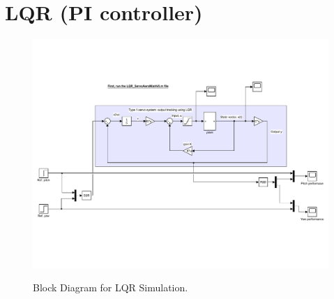 \section{LQR (PI controller)}
\begin{figure}[!htbp]
    \centering
    \includegraphics[width=.8\textwidth,keepaspectratio=true]{figs/img/LQR_Simulink_Sim}
    \label{fig:LQR_Sim_Block_Diagram}
    \caption{Block Diagram for LQR Simulation.}
\end{figure}
